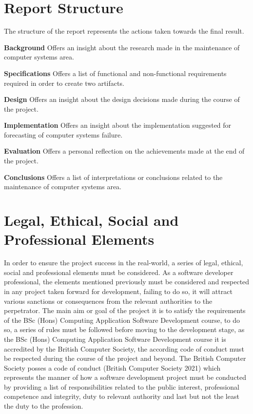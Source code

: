 \section{Report Structure}

\noindent
The structure of the report represents the actions taken towards the final result. \newline

\noindent
\textbf{Background} Offers an insight about the research made in the maintenance of computer systems area.
\newline

\noindent
\textbf{Specifications} Offers a list of functional and non-functional requirements required in order
to create two artifacts.
\newline

\noindent
\textbf{Design} Offers an insight about the design decisions made during the course of the project.
\newline

\noindent
\textbf{Implementation} Offers an insight about the implementation suggested for forecasting of computer systems failure.
\newline

\noindent
\textbf{Evaluation} Offers a personal reflection on the achievements made at the end of the project.
\newline

\noindent
\textbf{Conclusions} Offers a list of interpretations or conclusions related to the maintenance of computer systems area.
\newline

\newpage

\section{Legal, Ethical, Social and Professional Elements}

In order to ensure the project success in the real-world, a series of legal, ethical, social
and professional elements must be considered. As a software developer professional, the
elements mentioned previously must be considered and respected in any project taken
forward for development, failing to do so, it will attract various sanctions or
consequences from the relevant authorities to the perpetrator. The main aim or goal
of the project it is to satisfy the requirements of the BSc (Hons) Computing Application
Software Development course, to do so, a series of rules must be followed before moving
to the development stage, as the BSc (Hons) Computing Application Software Development
course it is accredited by the British Computer Society, the according code of conduct
must be respected during the course of the project and beyond. The British Computer
Society posses a code of conduct (British Computer Society 2021) which represents
the manner of how a software development project must be conducted by providing
a list of responsibilities related to the public interest, professional competence and
integrity, duty to relevant authority and last but not the least the duty to the
profession.

